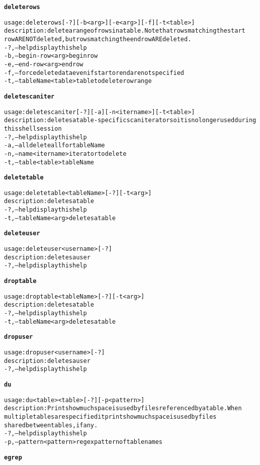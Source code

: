 \begin{alltt}
\textbf{deleterows}

    usage: deleterows [-?] [-b <arg>] [-e <arg>] [-f] [-t <table>]
    description: delete a range of rows in a table.  Note that rows matching the start
              row ARE NOT deleted, but rows matching the end row ARE deleted.
      -?,--help  display this help
      -b,--begin-row <arg>  begin row
      -e,--end-row <arg>  end row
      -f,--force  delete data even if start or end are not specified
      -t,--tableName <table>  table to delete row range

\textbf{deletescaniter}

    usage: deletescaniter [-?] [-a] [-n <itername>] [-t <table>]
    description: deletes a table-specific scan iterator so it is no longer used during
              this shell session
      -?,--help  display this help
      -a,--all  delete all for tableName
      -n,--name <itername>  iterator to delete
      -t,--table <table>  tableName

\textbf{deletetable}

    usage: deletetable <tableName> [-?] [-t <arg>]
    description: deletes a table
      -?,--help  display this help
      -t,--tableName <arg>  deletes a table

\textbf{deleteuser}

    usage: deleteuser <username> [-?]
    description: deletes a user
      -?,--help  display this help

\textbf{droptable}

    usage: droptable <tableName> [-?] [-t <arg>]
    description: deletes a table
      -?,--help  display this help
      -t,--tableName <arg>  deletes a table

\textbf{dropuser}

    usage: dropuser <username> [-?]
    description: deletes a user
      -?,--help  display this help

\textbf{du}

    usage: du <table>{ <table>} [-?] [-p <pattern>]
    description: Prints how much space is used by files referenced by a table.  When
              multiple tables are specified it prints how much space is used by files
              shared between tables, if any.
      -?,--help  display this help
      -p,--pattern <pattern>  regex pattern of table names

\textbf{egrep}


\end{alltt}
